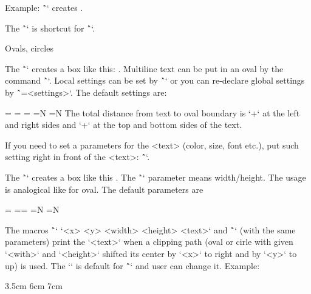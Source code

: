 {Example: \~``
creates .

The \^`` is shortcut for 
\^``.

\secc Ovals, circles

\new
The \^`` creates a box like this: . 
Multiline text can be put in an oval by the command \^``.
Local settings can be set by
\^`` or you can re-declare global settings by
\^`\ovalparams={<settings>}`. The default settings are:

\begtt
\ovalparams={\roundness=2pt           %
             \fcolor=\Yellow          %
             \lcolor=\Red             %
             \lwidth=0.5bp            %
             \shadow=N                %
             \overlapmargins=N        %
             \hhkern=0pt \vvkern=0pt} %
\endtt
The total distance from text to oval boundary is `\hhkern+\roundness` at the left and right 
sides and
`\vvkern+\roundness` at the top and bottom sides of the text.

If you need to set a parameters for the <text> (color, size, font etc.),
put such setting right in front of the <text>:
\^``.

\new
The \^`` creates a box like this .
The \^`\ratio` parameter means width/height. The usage is analogical like for oval. 
The default parameters are

\begtt
\circleparams={ \fcolor=\Yellow \lcolor=\Red \lwidth=0.5bp 
               \shadow=N \ignoremargins=N \hhkern=2pt \vvkern=2pt}
\endtt

\new
The macros \^`\clipinoval` `<x> <y> <width> <height> {<text>}`
and \^`\clipincircle` (with the same parameters)
print the `<text>` when a clipping path (oval or cirle with given
`<with>` and `<height>` shifted its center by `<x>` to right and by `<y>` to up)
is used.
The `\roundness=5mm` is default for \^`\clipinoval` and user can change it.
Example:

\begtt 
\clipincircle 3cm 3.5cm 6cm 7cm {\picw=6cm } 
\endtt

}
